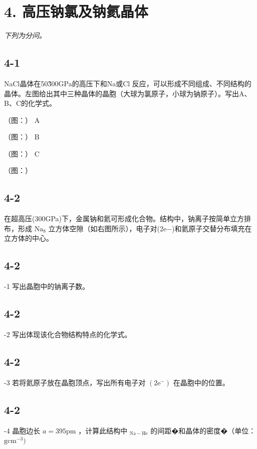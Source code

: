 \section*{4. 高压钠氯及钠氦晶体}
\textit{下列为分问。}

\subsection*{4-1}
NaCl晶体在50\~300GPa的⾼压下和Na或Cl 反应，可以形成不同组成、不同结构的晶体。左图给出其中三种晶体的晶胞（⼤球为氯原⼦，⼩球为钠原⼦）。写出A、B、C的化学式。

（图：）
A

（图：）
B

（图：）
C

（图：）

\subsection*{4-2}
在超⾼压(300GPa)下，⾦属钠和氦可形成化合物。结构中，钠离⼦按简单⽴⽅排布，形成 $\mathrm { N a } _ { 8 }$ ⽴⽅体空隙（如右图所⽰），电⼦对(2e−)和氦原⼦交替分布填充在⽴⽅体的中⼼。

\subsection*{4-2}
-1 写出晶胞中的钠离⼦数。

\subsection*{4-2}
-2 写出体现该化合物结构特点的化学式。

\subsection*{4-2}
-3 若将氦原⼦放在晶胞顶点，写出所有电⼦对 $( 2 \mathrm { e ^ { - } } )$ 在晶胞中的位置。

\subsection*{4-2}
-4 晶胞边⻓ $a = 3 9 5 \mathrm { p m }$ ，计算此结构中 $_ \mathrm { N a - H e }$ 的间距�和晶体的密度�（单位： $\mathrm { g c m ^ { - 3 } } )$
